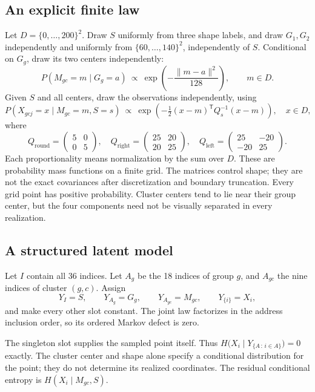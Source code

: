 \documentclass[11pt]{article}
\begin{document}
\subsection{An explicit finite law}
Let $D=\{0,\ldots,200\}^2$. Draw $S$ uniformly from three shape labels, and
draw $G_1,G_2$ independently and uniformly from $\{60,\ldots,140\}^2$,
independently of $S$. Conditional on $G_g$, draw its two centers independently:
\[
 P(M_{gc}=m\mid G_g=a)\ \propto\
 \exp\!\left(-\frac{\|m-a\|^2}{128}\right),\qquad m\in D.
\]
Given $S$ and all centers, draw the observations independently, using
\[
 P(X_{gcj}=x\mid M_{gc}=m,S=s)\ \propto\
 \exp\!\left(-\tfrac12(x-m)^\mathsf{T}Q_s^{-1}(x-m)\right),\quad x\in D,
\]
where
\[
 Q_{\mathrm{round}}=\begin{pmatrix}5&0\\0&5\end{pmatrix},\quad
 Q_{\mathrm{right}}=\begin{pmatrix}25&20\\20&25\end{pmatrix},\quad
 Q_{\mathrm{left}}=\begin{pmatrix}25&-20\\-20&25\end{pmatrix}.
\]
Each proportionality means normalization by the sum over $D$. These are
probability mass functions on a finite grid. The matrices control shape; they
are not the exact covariances after discretization and boundary truncation.
Every grid point has positive probability. Cluster centers tend to lie near
their group center, but the four components need not be visually separated in
every realization.

\subsection{A structured latent model}
Let $I$ contain all 36 indices. Let $A_g$ be the 18 indices of group $g$, and
$A_{gc}$ the nine indices of cluster $(g,c)$. Assign
\[
 Y_I=S,\qquad Y_{A_g}=G_g,\qquad Y_{A_{gc}}=M_{gc},\qquad
 Y_{\{i\}}=X_i,
\]
and make every other slot constant. The joint law factorizes in the address
inclusion order, so its ordered Markov defect is zero.

The singleton slot supplies the sampled point itself. Thus
$H\bigl(X_i\mid Y_{\{A\,:\,i\in A\}}\bigr)=0$ exactly. The cluster center and shape alone
specify a conditional distribution for the point; they do not determine its
realized coordinates. The residual conditional entropy is
$H(X_i\mid M_{gc},S)$.
\end{document}
